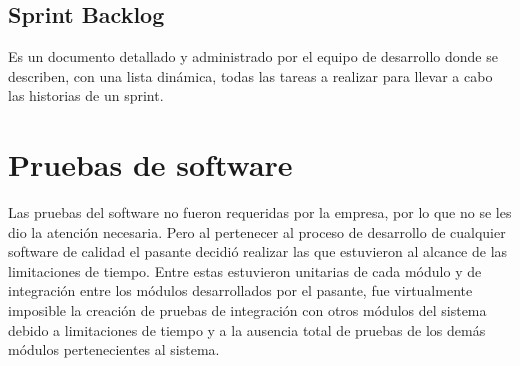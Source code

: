 \subsection{Sprint Backlog}
Es un documento detallado y administrado por el equipo de desarrollo donde se describen, con una lista dinámica, todas las tareas a realizar para llevar a cabo las historias de un sprint.

\section{Pruebas de software}

Las pruebas del software no fueron requeridas por la empresa, por lo que no se les dio la atención necesaria. Pero al pertenecer al proceso de desarrollo de cualquier software de calidad el pasante decidió realizar las que estuvieron al alcance de las limitaciones de tiempo. Entre estas estuvieron unitarias de cada módulo y de integración entre los módulos desarrollados por el pasante, fue virtualmente imposible la creación de pruebas de integración con otros módulos del sistema debido a limitaciones de tiempo y a la ausencia total de pruebas de los demás módulos pertenecientes al sistema.

